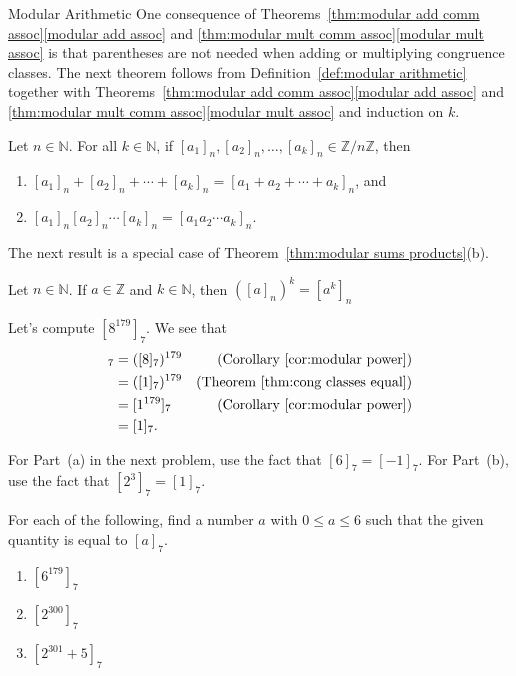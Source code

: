 \begin{section}{Modular Arithmetic}
One consequence of Theorems~\ref{thm:modular add comm assoc}\ref{modular add assoc} and \ref{thm:modular mult comm assoc}\ref{modular mult assoc} is that parentheses are not needed when adding or multiplying congruence classes.  The next theorem follows from Definition~\ref{def:modular arithmetic} together with Theorems~\ref{thm:modular add comm assoc}\ref{modular add assoc} and \ref{thm:modular mult comm assoc}\ref{modular mult assoc} and induction on $k$.

\begin{theorem}\label{thm:modular sums products}
Let $n\in \mathbb{N}$.  For all $k\in \mathbb{N}$, if $[a_1]_n,[a_2]_n,\ldots, [a_k]_n \in \mathbb{Z}/n\mathbb{Z}$, then 
\begin{enumerate}[label=\textrm{(\alph*)}]
\item $[a_1]_n+[a_2]_n+\cdots+ [a_k]_n = [a_1 + a_2 +\cdots+ a_k]_n$, and
\item $[a_1]_n [a_2]_n \cdots  [a_k]_n = [a_1 a_2 \cdots a_k]_n$.
\end{enumerate}
\end{theorem}

The next result is a special case of Theorem~\ref{thm:modular sums products}(b).

\begin{corollary}\label{cor:modular power}
Let $n\in \mathbb{N}$. If $a\in\mathbb{Z}$ and $k\in \mathbb{N}$, then $([a]_n)^k = [a^k]_n$
\end{corollary}

\begin{example}
Let's compute $[8^{179}]_7$.  We see that
\begin{align*}
[8^{179}]_7 & = ([8]_7)^{179} & (\text{Corollary~\ref{cor:modular power}})\\
& = ([1]_7)^{179} & (\text{Theorem~\ref{thm:cong classes equal}})\\
& = [1^{179}]_7 & (\text{Corollary~\ref{cor:modular power}})\\
& = [1]_7.
\end{align*}
\end{example}

For Part~(a) in the next problem, use the fact that $[6]_7 = [-1]_7$. For Part~(b), use the fact that $[2^3]_7 = [1]_7$.

\begin{problem}
For each of the following, find a number $a$ with $0\le a \le 6$ such that the given quantity is equal to $[a]_7$.
\begin{enumerate}[label=\textrm{(\alph*)}]
\item $[6^{179}]_7$
\item $[2^{300}]_7$
\item $[2^{301} +5]_7$
\end{enumerate}
\end{problem}


\end{section}
